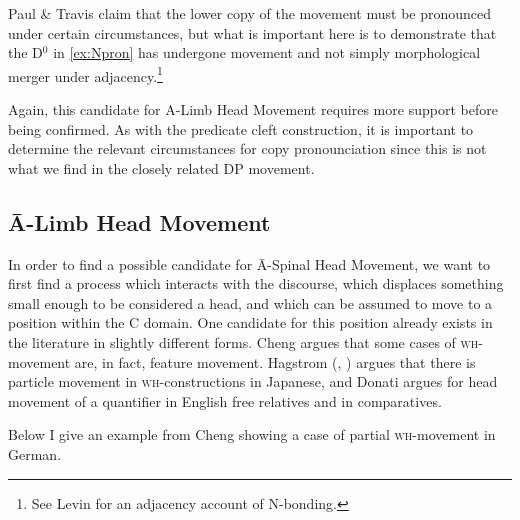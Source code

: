 \documentclass[output=paper,colorlinks,citecolor=brown,
]{langscibook}
\begin{document}
Paul \& Travis claim that the lower copy of the movement must be pronounced under certain circumstances, but what is important here is to demonstrate that the D$^0$ in \ref{ex:Npron} has undergone movement and not simply morphological merger under adjacency.\footnote{See Levin \citeyearpar{Levin:2015} for an adjacency account of N-bonding.}

Again, this candidate for A-Limb Head Movement requires more support before being confirmed. As with the predicate cleft construction, it is important to determine the relevant circumstances for copy pronounciation since this is not what we find in the closely related DP movement.

\subsection{\=A-Limb Head Movement}

In order to find a possible candidate for \=A-Spinal Head Movement, we want to first find a process which interacts with the discourse, which displaces something small enough to be considered a head, and which can be assumed to move to a position within the C domain.  One candidate for this position already exists in the literature in slightly different forms.  Cheng \citeyearpar{Cheng:2000b} argues that some cases of \textsc{wh-}movement are, in fact,  feature movement.  Hagstrom (\citeyear{Hagstrom:2000}, \citeyear{Hagstrom:2004}) argues that there is particle movement in \textsc{wh}-constructions in Japanese,  and Donati \citeyearpar{Donati:2006} argues for head movement of a quantifier in English free relatives and in comparatives.  

Below I give an example from Cheng \citeyearpar{Cheng:2000b} showing a case of partial \textsc{wh-}movement in German.  

\ea
{}
\z
\z
\end{document}
